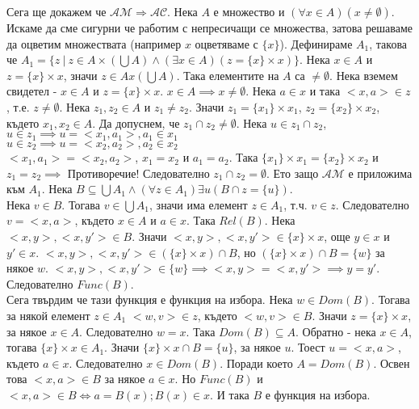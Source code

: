 \documentclass[fleqn, titlepage, 12pt]{report}
\begin{document}
Сега ще докажем че $ \mathcal{AM} \Rightarrow \mathcal{AC} $. Нека $ A $ е множество и
$ (\forall{x \in A})(x \neq \emptyset) $. Искаме да сме сигурни че работим с непресичащи се множества, затова решаваме
да оцветим множествата (например $ x $ оцветяваме с $ \{ x \} $). Дефинираме $ A_1 $, такова че
$ A_1 = \{z\ |\ z \in A \times (\bigcup A) \land (\exists{x \in A})(z = \{ x \} \times  x)\} $.
Нека $ x \in A $ и $ z = \{ x \} \times  x $, значи $ z \in A x (\bigcup A) $.
Така елементите на $ A $ са $ \neq \emptyset $. Нека вземем свидетел - $ x \in A $ и $ z = \{ x \} \times  x $.
$  x \in A \implies x \neq \emptyset $.
Нека $ a \in x $ и така $ <x,a> \in z $, т.е. $ z \neq \emptyset $. Нека $ z_1, z_2 \in A $ и $ z_1 \neq z_2 $.
Значи $ z_1 = \{ x_1 \} \times x_1 $, $z_2 = \{ x_2 \} \times x_2 $, където $ x_1, x_2 \in A $.
Да допуснем, че $ z_1 \cap z_2 \neq \emptyset $. Нека $ u \in z_1 \cap z_2 $,\\
$ u \in z_1 \implies u = <x_1, a_1>, a_1 \in x_1 $\\
$ u \in z_2 \implies u = <x_2, a_2>, a_2 \in x_2 $\\
$ <x_1, a_1> = <x_2, a_2> $, $ x_1 = x_2 $ и $ a_1 = a_2 $. Така $ \{ x_1 \} \times  x_1 = \{ x_2 \} \times  x_2 $
и $ z_1 = z_2 \implies $ Противоречие! Следователно $ z_1 \cap z_2 = \emptyset $. Ето защо $ \mathcal{AM} $ е приложима
към $ A_1 $. Нека $ B \subseteq \bigcup A_1 \land (\forall{z \in A_1})\exists{u}(B \cap z = \{ u \}) $.\\
Нека $ v \in B $. Тогава $ v \in \bigcup A_1 $, значи има елемент $ z \in A_1 $, т.ч. $ v \in z $.
Следователно $ v = <x,a> $, където $ x \in A $ и $ a \in x $. Така $ Rel(B) $. Нека $ <x,y>,<x,y'> \in B $.
Значи $ <x,y>, <x,y'>  \in \{ x \}\times x$, още $ y \in x $ и $ y' \in x $.
$ <x,y>,<x,y'> \in (\{ x \} \times  x) \cap B$, но $ (\{ x \} \times  x) \cap B = \{ w \} $ за някое $ w $.
$ <x,y>, <x,y'> \in \{ w \} \implies <x,y> = <x,y'> \implies y = y' $. Следователно $ Func(B) $.\\
Сега твърдим че тази функция е функция на избора. Нека $ w \in Dom(B) $. Тогава за някой елемент $ z \in A_1 $
$ <w,v> \in z $, където $ <w,v> \in B $. Значи $ z = \{ x \} \times  x $, за някое $ x \in A $.
Следователно $ w = x $. Така $ Dom(B) \subseteq A $. Обратно - нека $ x \in A $, тогава $ \{ x \} \times x \in A_1$.
Значи $ \{ x \} \times x \cap B = \{ u \} $, за някое $ u $. Тоест $ u = <x,a> $, където $ a \in x $.
Следователно $ x \in Dom(B) $. Поради което $ A = Dom(B) $. Освен това $ <x,a> \in B $ за някое $ a \in x $.
Но $ Func(B) $ и $ <x,a> \in B \Leftrightarrow  a = B(x); B(x) \in x$. И така $ B $ е функция на избора.
\end{document}
